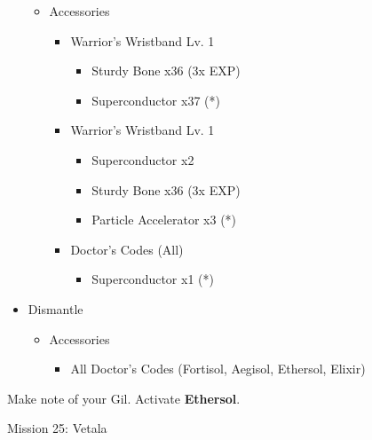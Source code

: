 \begin{multicols}{2}
\begin{upgrade}
\begin{itemize}
\begin{itemize}
\begin{itemize}
                    \end{itemize}
              \item Accessories
                    \begin{itemize}
                      \item Warrior's Wristband Lv. 1
                            \begin{itemize}
                              \item Sturdy Bone x36 (3x EXP)
                              \item Superconductor x37 (*)
                            \end{itemize}
                      \item Warrior's Wristband Lv. 1
                            \begin{itemize}
                              \item Superconductor x2
                              \item Sturdy Bone x36 (3x EXP)
                              \item Particle Accelerator x3 (*)
                            \end{itemize}
                      \item Doctor's Codes (All)
                            \begin{itemize}
                              \item Superconductor x1 (*)
                            \end{itemize}
                    \end{itemize}
            \end{itemize}
      \item Dismantle
            \begin{itemize}
              \item Accessories
                    \begin{itemize}
                      \item All Doctor's Codes (Fortisol, Aegisol, Ethersol, Elixir)
                    \end{itemize}
            \end{itemize}
    \end{itemize}
  \end{upgrade}
  Make note of your Gil.
  \newpage
  Activate \textbf{Ethersol}.
  \renewcommand{\fifth}{[5] Smart Bomb (\rav/\sab/\rav)}
  \begin{battle}{Mission 25: Vetala}
    \begin{itemize}

\end{itemize}
\end{battle}
\end{multicols}
